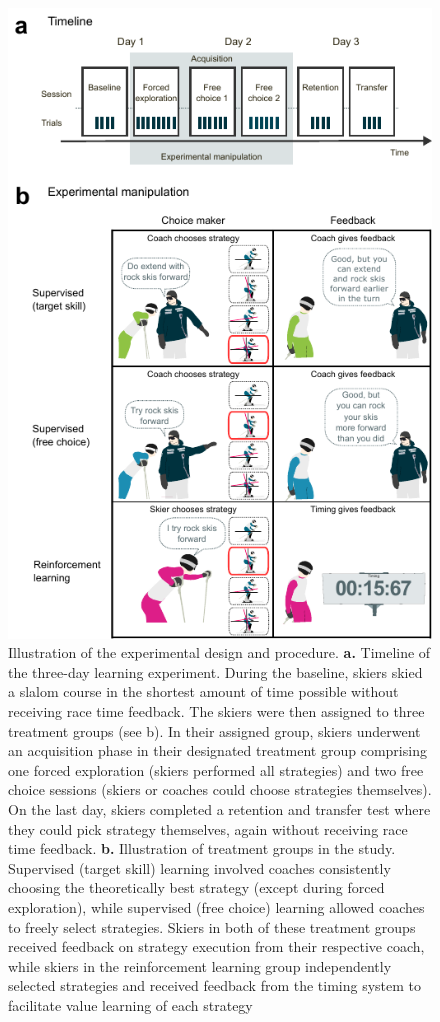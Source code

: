 \documentclass[pdflatex,sn-nature]{sn-jnl}%
\theoremstyle{thmstyleone}%
\theoremstyle{thmstyletwo}%
\theoremstyle{thmstylethree}%
\begin{document}
\begin{figure}[H]
\centering
\includegraphics{figures/figure_method_experiment.pdf}
\caption{Illustration of the experimental design and procedure. \textbf{a.} Timeline of the three-day learning experiment. During the baseline, skiers skied a slalom course in the shortest amount of time possible without receiving race time feedback. The skiers were then assigned to three treatment groups (see b). In their assigned group, skiers underwent an acquisition phase in their designated treatment group comprising one forced exploration (skiers performed all strategies) and two free choice sessions (skiers or coaches could choose strategies themselves). On the last day, skiers completed a retention and transfer test where they could pick strategy themselves, again without receiving race time feedback. \textbf{b.} Illustration of treatment groups in the study. Supervised (target skill) learning involved coaches consistently choosing the theoretically best strategy (except during forced exploration), while supervised (free choice) learning allowed coaches to freely select strategies. Skiers in both of these treatment groups received feedback on strategy execution from their respective coach, while skiers in the reinforcement learning group independently selected strategies and received feedback from the timing system to facilitate value learning of each strategy}
\label{fig:experiment}
\end{figure}
\end{document}
